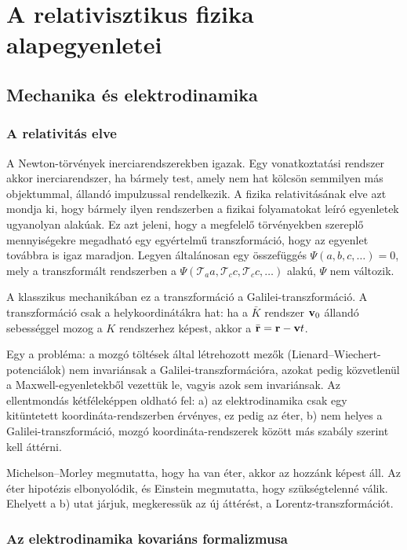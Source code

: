 \chapter{A relativisztikus fizika alapegyenletei}\label{2tetel}
 
 \section{Mechanika és elektrodinamika}
  
  \subsection{A relativitás elve}
   
   A Newton-törvények inerciarendszerekben igazak. Egy vonatkoztatási rendszer akkor inerciarendszer, ha bármely test, amely nem hat kölcsön semmilyen más objektummal, állandó impulzussal rendelkezik. A fizika relativitásának elve azt mondja ki, hogy bármely ilyen rendszerben a fizikai folyamatokat leíró egyenletek ugyanolyan alakúak. Ez azt jeleni, hogy a megfelelő törvényekben szereplő mennyiségekre megadható egy egyértelmű transzformáció, hogy az egyenlet továbbra is igaz maradjon. Legyen általánosan egy összefüggés $\Psi(a,b,c,\dots)=0$, mely a transzformált rendszerben a $\Psi(\mathcal{T}_{a}a,\mathcal{T}_{c}c,\mathcal{T}_{c}c,\dots)$ alakú, $\Psi$ nem változik.
   
   A klasszikus mechanikában ez a transzformáció a Galilei-transzformáció. A transzformáció csak a helykoordinátákra hat: ha a $\bar{K}$ rendszer $\mathbf{v}_0$ állandó sebességgel mozog a $K$ rendszerhez képest, akkor a $\bar{\mathbf{r}}=\mathbf{r}-\mathbf{v}t$. 
  
   Egy a probléma: a mozgó töltések által létrehozott mezők (Lienard--Wiechert-potenciálok) nem invariánsak a Galilei-transzformációra, azokat pedig közvetlenül a Maxwell-egyenletekből vezettük le, vagyis azok sem invariánsak. Az ellentmondás kétféleképpen oldható fel: a) az elektrodinamika csak egy kitüntetett koordináta-rendszerben érvényes, ez pedig az éter, b) nem helyes a Galilei-transzformáció, mozgó koordináta-rendszerek között más szabály szerint kell áttérni. 
  
   Michelson--Morley megmutatta, hogy ha van éter, akkor az hozzánk képest áll. Az éter hipotézis elbonyolódik, és Einstein megmutatta, hogy szükségtelenné válik. Ehelyett a b) utat járjuk, megkeressük az új áttérést, a Lorentz-transzformációt.
      
  \subsection{Az elektrodinamika kovariáns formalizmusa}
   
